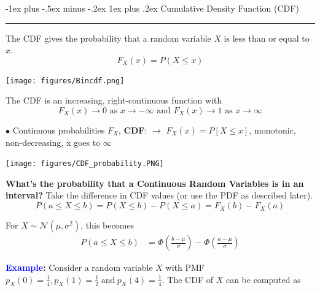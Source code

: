 \documentclass[letterpaper, 10.5pt,landscape]{article}
\makeatletter
\newcommand{\N}{\mathcal{N}}
\renewcommand{\subsubsection}{\@startsection{subsubsection}{3}{0mm}%
                                {-1ex plus -.5ex minus -.2ex}%
                                {1ex plus .2ex}%
                                {\normalfont\small\bfseries}}
\makeatother
\begin{document}
\begin{multicols*}{3}
\subsubsection{Cumulative Density Function (CDF)}{\color{teal}\hrule height 0.5pt} \smallskip
The CDF gives the probability that a random variable $X$ is less than or equal to $x$.
\[F_X(x) = P(X \leq x)\]
\vspace{-5pt}
\begin{center}
    \begin{minipage}{0.7\linewidth}
        \texttt{[image: figures/Bincdf.png]}
    \end{minipage}
\end{center}
\vspace{-5pt}



The CDF is an increasing, right-continuous function with
\[F_X(x) \to 0 \textrm{ as $x \to -\infty$ and } F_X(x) \to 1 \textrm{ as $x \to \infty$} \]




$\bullet$ Continuous probabilities $F_{X}$, \textbf{CDF}:
$\rightarrow$ \( F_{X}(x) = P[X \leq x] \),  monotonic, non-decreasing, x goes to $\infty$
\begin{center}
    \begin{minipage}{\linewidth}
    \texttt{[image: figures/CDF\_probability.PNG]}
    \end{minipage}
\end{center}

\textbf{What's the probability that a Continuous Random Variables is in an interval?} Take the difference in CDF values (or use the PDF as described later).
\[\boxed{P(a \leq X \leq b) = P(X \leq b) - P(X \leq a) = F_X(b) - F_X(a)}\]

For $X \sim \N(\mu,\sigma^2)$, this becomes
\begin{align*}
P(a\leq X\leq b)&=\Phi \left(\frac{b-\mu }{\sigma } \right) - \Phi \left( \frac{a-\mu }{\sigma } \right)
\end{align*}


\vspace{5pt}
\textbf{\textcolor{blue}{Example}:} Consider a random variable $X$ with PMF $p_{X}(0) = \frac{1}{4}, p_{X}(1) = \frac{1}{2} \hspace{3pt} \text{and} \hspace{3pt} p_{X}(4) = \frac{1}{4} $. The CDF of $X$ can be computed as 
\vspace{-5pt}


\end{multicols*}
\end{document}

